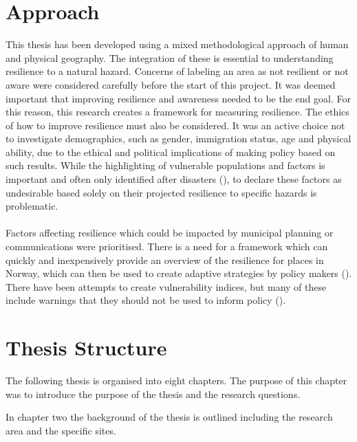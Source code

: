 \section{Approach}

This thesis has been developed using a mixed methodological approach of human and physical geography. The integration of these is essential to understanding resilience to a natural hazard. Concerns of labeling an area as not resilient or not aware were considered carefully before the start of this project.  It was deemed important that improving resilience and awareness needed to be the end goal. For this reason, this research creates a framework for measuring resilience. The ethics of how to improve resilience must also be considered. It was an active choice not to investigate demographics, such as gender, immigration status, age and physical ability, due to the ethical and political implications of making policy based on such results. While the highlighting of vulnerable populations and factors is important and often only identified after disasters (\cite{cutter_community_2020}), to declare these factors as undesirable based solely on their projected resilience to specific hazards is problematic. 

\paragraph{}
Factors affecting resilience which could be impacted by municipal planning or communications were prioritised. There is a need for a framework which can quickly and inexpensively provide an overview of the resilience for places in Norway, which can then be used to create adaptive strategies by policy makers (\cite{opach_seeking_2020}). There have been attempts to create vulnerability indices, but many of these include warnings that they should not be used to inform policy (\cite{opach_seeking_2020}). 


\section{Thesis Structure}
The following thesis is organised into eight chapters. The purpose of this chapter was to introduce the purpose of the thesis and the research questions.

In chapter two the background of the thesis is outlined including the research area and the specific sites. 

